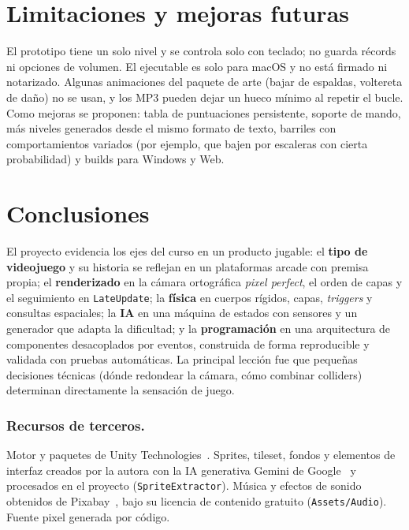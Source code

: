 \documentclass[runningheads]{llncs}
\begin{document}
\section{Limitaciones y mejoras futuras}
El prototipo tiene un solo nivel y se controla solo con teclado; no guarda récords ni opciones de
volumen. El ejecutable es solo para macOS y no está firmado ni notarizado. Algunas animaciones del
paquete de arte (bajar de espaldas, voltereta de daño) no se usan, y los MP3 pueden dejar un hueco
mínimo al repetir el bucle. Como mejoras se proponen: tabla de puntuaciones persistente, soporte de
mando, más niveles generados desde el mismo formato de texto, barriles con comportamientos
variados (por ejemplo, que bajen por escaleras con cierta probabilidad) y builds para Windows y Web.

\section{Conclusiones}
El proyecto evidencia los ejes del curso en un producto jugable: el \textbf{tipo de videojuego} y su
historia se reflejan en un plataformas arcade con premisa propia; el \textbf{renderizado} en la cámara
ortográfica \emph{pixel perfect}, el orden de capas y el seguimiento en \texttt{LateUpdate}; la
\textbf{física} en cuerpos rígidos, capas, \emph{triggers} y consultas espaciales; la \textbf{IA} en
una máquina de estados con sensores y un generador que adapta la dificultad; y la
\textbf{programación} en una arquitectura de componentes desacoplados por eventos, construida de
forma reproducible y validada con pruebas automáticas. La principal lección fue que pequeñas
decisiones técnicas (dónde redondear la cámara, cómo combinar colliders) determinan directamente la
sensación de juego.

\subsubsection*{Recursos de terceros.}
Motor y paquetes de Unity Technologies~\cite{unity}. Sprites, tileset, fondos y elementos de interfaz
creados por la autora con la IA generativa Gemini de Google~\cite{gemini} y procesados en el proyecto
(\texttt{SpriteExtractor}). Música y efectos de sonido obtenidos de Pixabay~\cite{pixabay}, bajo su
licencia de contenido gratuito (\texttt{Assets/Audio}). Fuente pixel generada por código.
\end{document}
